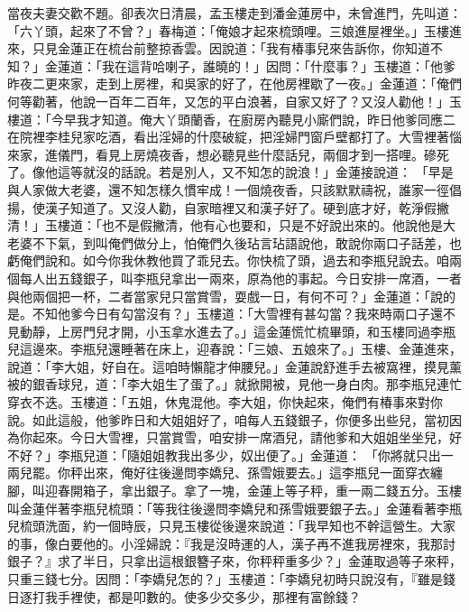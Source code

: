 當夜夫妻交歡不題。卻表次日清晨，孟玉樓走到潘金蓮房中，未曾進門，先叫道：「六丫頭，起來了不曾？」春梅道：「俺娘才起來梳頭哩。三娘進屋裡坐。」玉樓進來，只見金蓮正在梳台前整掠香雲。因說道：「我有椿事兒來告訴你，你知道不知？」金蓮道：「我在這背哈喇子，誰曉的！」因問：「什麼事？」玉樓道：「他爹昨夜二更來家，走到上房裡，和吳家的好了，在他房裡歇了一夜。」金蓮道：「俺們何等勸著，他說一百年二百年，又怎的平白浪著，自家又好了？又沒人勸他！」玉樓道：「今早我才知道。俺大丫頭蘭香，在廚房內聽見小廝們說，昨日他爹同應二在院裡李桂兒家吃酒，看出淫婦的什麼破綻，把淫婦門窗戶壁都打了。大雪裡著惱來家，進儀門，看見上房燒夜香，想必聽見些什麼話兒，兩個才到一搭哩。磣死了。像他這等就沒的話說。若是別人，又不知怎的說浪！」金蓮接說道： 「早是與人家做大老婆，還不知怎樣久慣牢成！一個燒夜香，只該默默禱祝，誰家一徑倡揚，使漢子知道了。又沒人勸，自家暗裡又和漢子好了。硬到底才好，乾淨假撇清！」玉樓道：「也不是假撇清，他有心也要和，只是不好說出來的。他說他是大老婆不下氣，到叫俺們做分上，怕俺們久後玷言玷語說他，敢說你兩口子話差，也虧俺們說和。如今你我休教他買了乖兒去。你快梳了頭，過去和李瓶兒說去。咱兩個每人出五錢銀子，叫李瓶兒拿出一兩來，原為他的事起。今日安排一席酒，一者與他兩個把一杯，二者當家兒只當賞雪，耍戲一日，有何不可？」金蓮道：「說的是。不知他爹今日有勾當沒有？」玉樓道：「大雪裡有甚勾當？我來時兩口子還不見動靜，上房門兒才開，小玉拿水進去了。」這金蓮慌忙梳畢頭，和玉樓同過李瓶兒這邊來。李瓶兒還睡著在床上，迎春說：「三娘、五娘來了。」玉樓、金蓮進來，說道：「李大姐，好自在。這咱時懶龍才伸腰兒。」金蓮說舒進手去被窩裡，摸見薰被的銀香球兒，道：「李大姐生了蛋了。」就掀開被，見他一身白肉。那李瓶兒連忙穿衣不迭。玉樓道：「五姐，休鬼混他。李大姐，你快起來，俺們有椿事來對你說。如此這般，他爹昨日和大姐姐好了，咱每人五錢銀子，你便多出些兒，當初因為你起來。今日大雪裡，只當賞雪，咱安排一席酒兒，請他爹和大姐姐坐坐兒，好不好？」李瓶兒道：「隨姐姐教我出多少，奴出便了。」金蓮道： 「你將就只出一兩兒罷。你秤出來，俺好往後邊問李嬌兒、孫雪娥要去。」這李瓶兒一面穿衣纏腳，叫迎春開箱子，拿出銀子。拿了一塊，金蓮上等子秤，重一兩二錢五分。玉樓叫金蓮伴著李瓶兒梳頭：「等我往後邊問李嬌兒和孫雪娥要銀子去。」金蓮看著李瓶兒梳頭洗面，約一個時辰，只見玉樓從後邊來說道：「我早知也不幹這營生。大家的事，像白要他的。小淫婦說：『我是沒時運的人，漢子再不進我房裡來，我那討銀子？』求了半日，只拿出這根銀簪子來，你秤秤重多少？」金蓮取過等子來秤，只重三錢七分。因問：「李嬌兒怎的？」玉樓道：「李嬌兒初時只說沒有，『雖是錢日逐打我手裡使，都是叩數的。使多少交多少，那裡有富餘錢？ 